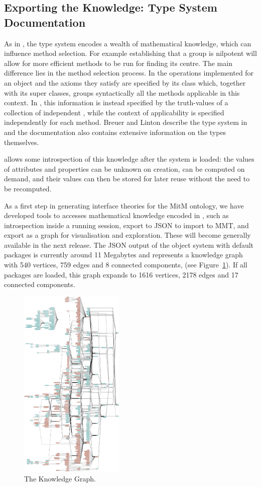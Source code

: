 \subsection{Exporting the \GAP Knowledge: Type System Documentation}
\label{sec:gaptypes}

As in \Sage, the \GAP type system encodes a wealth of mathematical
knowledge, which can influence method selection. For example
establishing that a group is nilpotent will allow for more efficient
methods to be run for finding its centre. The main difference lies in
the method selection process. In \Sage the operations
implemented for an object and the axioms they satisfy are specified by
its class which, together with its super classes, groups syntactically
all the methods applicable in this context. In \GAP, this information
is instead specified by the truth-values of a collection of
independent , while the context of applicability is
specified independently for each method.
%
Breuer and Linton describe the \GAP type system in \cite{breuer-linton} and
the \GAP documentation \cite{GAP4} also contains extensive information on the types
themselves.

\GAP allows some introspection of this knowledge after the system is loaded: the values of
attributes and properties can be unknown on creation, can be computed on demand, and their
values can then be stored for later reuse without the need to be recomputed.

As a first step in generating interface theories for the MitM ontology, we have developed
tools to accesses mathematical knowledge encoded in \GAP, such as introspection inside a
running \GAP session, export to JSON to import to MMT, and export as a graph for
visualisation and exploration. These will become generally available in the next \GAP
release. The JSON output of the \GAP object system with default packages is currently
around 11 Megabytes and represents a knowledge graph with 540 vertices, 759 edges and 8 connected
components, (see Figure~\ref{fig:gap-graph}). If all
packages are loaded, this graph expands to 1616 vertices, 2178 edges and 17 connected
components.

\begin{figure}[ht]\centering
  \includegraphics[width=5cm]{gap-graph}
  \caption{The \GAP Knowledge Graph.\label{fig:gap-graph}}
\end{figure}

